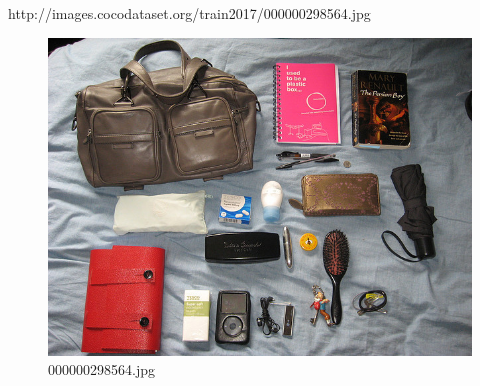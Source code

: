 http://images.cocodataset.org/train2017/000000298564.jpg
\begin{figure}[h]
    \centering
    \includegraphics[width=0.8\linewidth]{../image set/hard/000000298564.jpg}
    \caption{000000298564.jpg}
\end{figure}
